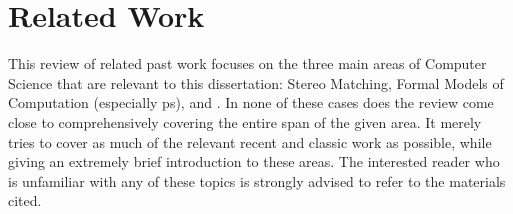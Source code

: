 
\chapter{Related Work}
This review of related past work focuses on the three main areas of Computer Science that are relevant to this dissertation:  Stereo Matching, Formal Models of Computation (especially \gls{ps}), and .  In none of these cases does the review come close to comprehensively covering the entire span of the given area.  It merely tries to cover as much of the relevant recent and classic work as possible, while giving an extremely brief introduction to these areas.  The interested reader who is unfamiliar with any of these topics is strongly advised to refer to the materials cited.








